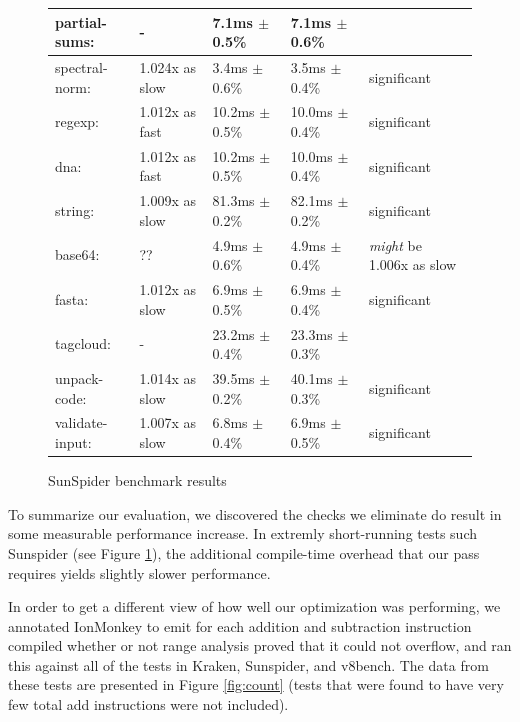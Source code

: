 \documentclass{article}
\begin{document}
\begin{figure}[H]
\begin{center}
\begin{tabular}{|l|l|l|l|l|}
\hline\hspace{0.5em} partial-sums:      & -                &   7.1ms $\pm$ 0.5\% &    7.1ms $\pm$ 0.6\% & \\
\hline\hspace{0.5em} spectral-norm:     & 1.024x as slow &   3.4ms $\pm$ 0.6\% &    3.5ms $\pm$ 0.4\%   &  significant \\
\hline\hline
regexp:              & 1.012x as fast   &  10.2ms $\pm$ 0.5\% &   10.0ms $\pm$ 0.4\%   &  significant \\
\hline\hspace{0.5em} dna:               & 1.012x as fast   &  10.2ms $\pm$ 0.5\% &   10.0ms $\pm$ 0.4\%   &  significant \\
\hline\hline
string:              & 1.009x as slow &  81.3ms $\pm$ 0.2\% &   82.1ms $\pm$ 0.2\%   &  significant \\
\hline\hspace{0.5em} base64:            & ??               &   4.9ms $\pm$ 0.6\% &    4.9ms $\pm$ 0.4\%   &  \textit{might} be 1.006x as slow \\
\hline\hspace{0.5em} fasta:             & 1.012x as slow &   6.9ms $\pm$ 0.5\% &    6.9ms $\pm$ 0.4\%   &  significant \\
\hline\hspace{0.5em} tagcloud:          & -                &  23.2ms $\pm$ 0.4\% &   23.3ms $\pm$ 0.3\% & \\
\hline\hspace{0.5em} unpack-code:       & 1.014x as slow &  39.5ms $\pm$ 0.2\% &   40.1ms $\pm$ 0.3\%   &  significant \\
\hline\hspace{0.5em} validate-input:    & 1.007x as slow &   6.8ms $\pm$ 0.4\% &    6.9ms $\pm$ 0.5\%   &  significant  \\
\hline
\end{tabular}
\caption{SunSpider benchmark results}
\label{fig:sunspider}
\end{center}
\end{figure}


To summarize our evaluation, we discovered the checks we eliminate do result in
some measurable performance increase. In extremly short-running tests such
Sunspider (see Figure \ref{fig:sunspider}), the additional compile-time
overhead that our pass requires yields slightly slower performance.


In order to get a different view of how well our optimization was
performing, we annotated IonMonkey to emit for each addition and subtraction
instruction compiled whether or not range analysis proved that it
could not overflow, and ran this against all of the tests in Kraken,
Sunspider, and v8bench. The data from these tests are presented in Figure
\ref{fig:count} (tests that were found to have very few total add
instructions were not included).
\end{document}
